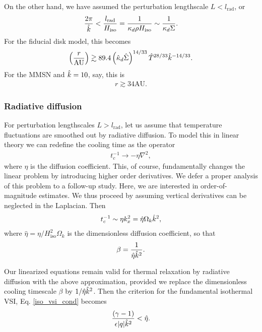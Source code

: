 On the other hand, we have assumed the perturbation lengthscale
$L<l_\mathrm{rad}$, or
\begin{align} 
  \frac{2\pi}{\hat{k}} < \frac{l_\mathrm{rad}}{H_\mathrm{iso}} =
  \frac{1}{\kappa_d\rho H_\mathrm{iso}} \sim
  \frac{1}{\kappa_d\Sigma}. 
\end{align}
For the fiducial disk model, this becomes 
\begin{align}
  \left(\frac{r}{\mathrm{AU}}\right) \gtrsim 
  89.4\left(\hat{\kappa}_d\hat{\Sigma}\right)^{14/33}\hat{T}^{28/33}\hat{k}^{-14/33}.  
\end{align}
For the MMSN and $\hat{k}=10$, say, this is
\begin{align*}
  r \gtrsim 34 \mathrm{AU}. 
\end{align*}

\subsubsection{Radiative diffusion}
For perturbation lengthscales $L>l_\mathrm{rad}$,  
let us assume that temperature fluctuations are smoothed out by
radiative diffusion. To model this in linear theory we can redefine
the cooling time as the operator 
\begin{align}
  t_c^{-1} \to -\eta \nabla^2, 
\end{align}
where $\eta$ is the diffusion coefficient. This, of course,
fundamentally changes the linear problem by introducing higher order
derivatives. We defer a proper analysis of this problem to a follow-up
study. Here, we are interested in order-of-magnitude estimates. We
thus proceed by assuming vertical derivatives can be neglected in the
Laplacian. Then
\begin{align}
  t_c^{-1} \sim \eta k_x^2 = \hat{\eta} \Omega_k \hat{k}^2,
\end{align}
where $\hat{\eta} = \eta/H_\mathrm{iso}^2\Omega_k$ is the
dimensionless diffusion coefficient, so that
\begin{align}
  \beta = \frac{1}{\hat{\eta}\hat{k}^2}. 
\end{align}

Our linearized equations remain valid for thermal relaxation by
radiative diffusion with the above approximation, provided we replace
the dimensionless cooling timescale $\beta$ by
$1/\hat{\eta}\hat{k}^2$. Then the criterion for the fundamental
isothermal VSI, Eq. \ref{iso_vsi_cond} becomes
\begin{align}\label{iso_vsi_cond_diff}
  \frac{(\gamma-1)}{\epsilon |q|\hat{k}^2}< \hat{\eta}. 
\end{align}

